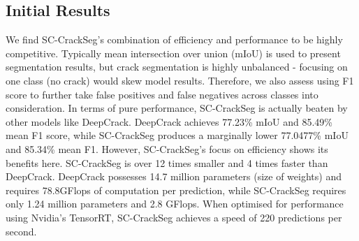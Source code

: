 \documentclass[a4paper,12pt]{report}
\begin{document}
    \subsection{Initial Results}
    We find SC-CrackSeg's combination of efficiency and performance to be highly competitive. Typically mean intersection over union (mIoU) is used to present segmentation results, but crack segmentation is highly unbalanced - focusing on one class (no crack) would skew model results. Therefore, we also assess using F1 score to further take false positives and false negatives across classes into consideration. In terms of pure performance, SC-CrackSeg is actually beaten by other models like DeepCrack. DeepCrack achieves 77.23\% mIoU and 85.49\% mean F1 score, while SC-CrackSeg produces a marginally lower 77.0477\% mIoU and 85.34\% mean F1. However, SC-CrackSeg's focus on efficiency shows its benefits here. SC-CrackSeg is over 12 times smaller and 4 times faster than DeepCrack. DeepCrack possesses 14.7 million parameters (size of weights) and requires 78.8GFlops of computation per prediction, while SC-CrackSeg requires only 1.24 million parameters and 2.8 GFlops. When optimised for performance using Nvidia's TensorRT, SC-CrackSeg achieves a speed of 220 predictions per second.
\end{document}
